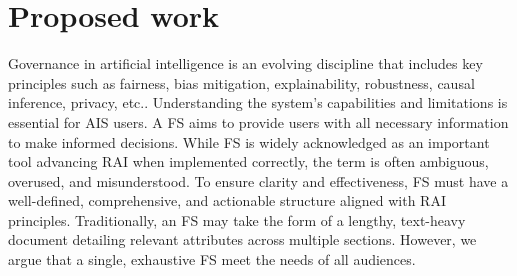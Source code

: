\documentclass[manuscript,screen,review]{acmart}
\begin{document}

\section{Proposed work}

	
	Governance in artificial intelligence is an evolving discipline that includes key principles such as fairness, bias mitigation, explainability, robustness, causal inference, privacy, etc.. Understanding the system’s capabilities and limitations is essential for AIS users. A FS aims to provide users with all necessary information to make informed decisions.  While FS is widely acknowledged as an important tool advancing RAI when implemented correctly, the term is often ambiguous, overused, and misunderstood. To ensure clarity and effectiveness, FS must have a well-defined, comprehensive, and actionable structure aligned with RAI principles. Traditionally, an FS may take the form of a lengthy, text-heavy document detailing relevant attributes across multiple sections. However, we argue that a single, exhaustive FS meet the needs of all audiences. 
	
\end{document}
